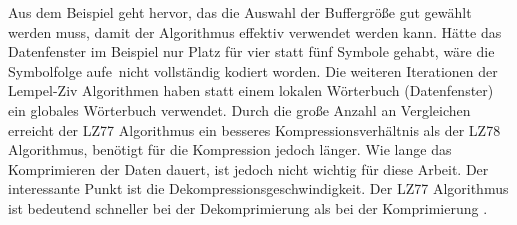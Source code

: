 Aus dem Beispiel geht hervor, das die Auswahl der Buffergröße gut gewählt werden muss, damit der Algorithmus effektiv verwendet werden kann.
Hätte das Datenfenster im Beispiel nur Platz für vier statt fünf Symbole gehabt, wäre die Symbolfolge \glqq aufe\grqq\ nicht vollständig kodiert worden.
Die weiteren Iterationen der Lempel-Ziv Algorithmen haben statt einem lokalen Wörterbuch (Datenfenster) ein globales Wörterbuch verwendet.
Durch die große Anzahl an Vergleichen erreicht der LZ77 Algorithmus ein besseres Kompressionsverhältnis als der LZ78 Algorithmus, benötigt für die Kompression jedoch länger.
Wie lange das Komprimieren der Daten dauert, ist jedoch nicht wichtig für diese Arbeit.
Der interessante Punkt ist die Dekompressionsgeschwindigkeit.
Der LZ77 Algorithmus ist bedeutend schneller bei der Dekomprimierung als bei der Komprimierung \cite{Choudhary2015}. \newpage

